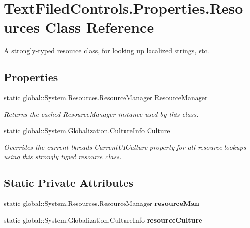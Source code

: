 \hypertarget{class_text_filed_controls_1_1_properties_1_1_resources}{}\section{Text\+Filed\+Controls.\+Properties.\+Resources Class Reference}
\label{class_text_filed_controls_1_1_properties_1_1_resources}


A strongly-\/typed resource class, for looking up localized strings, etc.  


\subsection*{Properties}
\begin{DoxyCompactItemize}
\item 
static global\+::\+System.\+Resources.\+Resource\+Manager \mbox{\hyperlink{class_text_filed_controls_1_1_properties_1_1_resources_ac25cf729078bfb32ba5aa10c9286a40c}{Resource\+Manager}}
\begin{DoxyCompactList}\small\item\em Returns the cached Resource\+Manager instance used by this class. \end{DoxyCompactList}\item 
static global\+::\+System.\+Globalization.\+Culture\+Info \mbox{\hyperlink{class_text_filed_controls_1_1_properties_1_1_resources_aec332738d182cad482fc22aa0899fdc6}{Culture}}
\begin{DoxyCompactList}\small\item\em Overrides the current thread\textquotesingle{}s Current\+U\+I\+Culture property for all resource lookups using this strongly typed resource class. \end{DoxyCompactList}\end{DoxyCompactItemize}
\subsection*{Static Private Attributes}
\begin{DoxyCompactItemize}
\item 
\mbox{\label{class_text_filed_controls_1_1_properties_1_1_resources_adb3cba059634df5ad0459f10cb2c1fa4}} 
static global\+::\+System.\+Resources.\+Resource\+Manager {\bfseries resource\+Man}
\item 
\mbox{\label{class_text_filed_controls_1_1_properties_1_1_resources_aa66cdcbf6859ff90ae07b89f3f427f04}} 
static global\+::\+System.\+Globalization.\+Culture\+Info {\bfseries resource\+Culture}
\end{DoxyCompactItemize}


